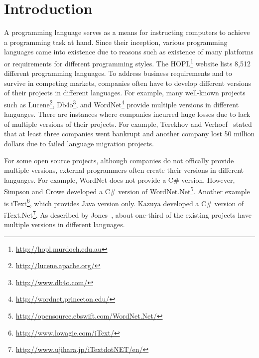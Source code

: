 \section{Introduction}
\label{sec:introduction} 

A programming language serves as a means for instructing computers to achieve a programming task at hand.
Since their inception, various programming languages came into existence due to  
reasons such as existence of many platforms or requirements for different programming styles.
The HOPL\footnote{\url{http://hopl.murdoch.edu.au}} website lists 
8,512 different programming languages. 
To address business requirements and to survive in competing markets, companies
often have to develop different versions of their projects in different languages.
For example, many well-known projects such as Lucene\footnote{\url{http://lucene.apache.org/}},
Db4o\footnote{\url{http://www.db4o.com/}}, and WordNet\footnote{\url{http://wordnet.princeton.edu/}} provide
multiple versions in different languages. There are instances where
companies incurred huge losses due to lack of multiple versions of their projects.
For example, Terekhov and Verhoef~\cite{terekhov2000realities} stated that at least three
companies went bankrupt and another company lost 50 million dollars due to failed language migration projects.

For some open source projects, although companies do not offically provide multiple versions, external programmers often
create their versions in different languages. For example, WordNet does not
provide a C\# version. However, Simpson and Crowe developed
a C\# version of WordNet.Net\footnote{\url{http://opensource.ebswift.com/WordNet.Net/}}. 
Another example is iText\footnote{\url{http://www.lowagie.com/iText/}}, which
provides Java version only. Kazuya developed a C\# version of 
iText.Net\footnote{\url{http://www.ujihara.jp/iTextdotNET/en/}}. As described by Jones~\cite{jones1998estimating}, 
about one-third of the existing projects have multiple versions in different languages.


